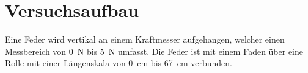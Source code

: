\section{Versuchsaufbau}
\label{sec:Versuchsaufbau}

Eine Feder wird vertikal an einem Kraftmesser aufgehangen, welcher einen Messbereich von \SI{0}{\newton} bis \SI{5}{\newton} umfasst. Die Feder ist mit einem Faden über eine Rolle mit einer Längenskala von \SI{0}{\centi\meter} bis \SI{67}{\centi\meter} verbunden. 